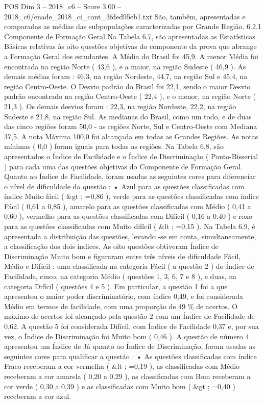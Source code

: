 \begin{textsample}{POS Dim 3 – 2018\_c6 – Score 3.00 – 2018\_c6/enade\_2018\_ci\_cont\_3fded95eb1.txt}
São, também, apresentadas e comparadas as médias das subpopulações caracterizadas por Grande Região. 6.2.1 Componente de Formação Geral Na Tabela 6.7, são apresentadas as Estatísticas Básicas relativas às oito questões objetivas do componente da prova que abrange a Formação Geral dos estudantes.
A Média do Brasil foi 45,9.
A menor Média foi encontrada na região Norte ( 43,6 ), e a maior, na região Sudeste ( 46,9 ).
As demais médias foram : 46,3, na região Nordeste, 44,7, na região Sul e 45,4, na região Centro-Oeste.
O Desvio padrão do Brasil foi 22,1, sendo o maior Desvio padrão encontrado na região Centro-Oeste ( 22,4 ), e o menor, na região Norte ( 21,3 ).
Os demais desvios foram : 22,3, na região Nordeste, 22,2, na região Sudeste e 21,8, na região Sul.
As medianas do Brasil, como um todo, e de duas das cinco regiões foram 50,0 - as regiões Norte, Sul e Centro-Oeste com Mediana 37,5.
A nota Máxima 100,0 foi alcançada em todas as Grandes Regiões.
As notas mínimas ( 0,0 ) foram iguais para todas as regiões.
Na Tabela 6.8, são apresentados o Índice de Facilidade e o Índice de Discriminação ( Ponto-Bisserial ) para cada uma das questões objetivas do Componente de Formação Geral.
Quanto ao Índice de Facilidade, foram usadas as seguintes cores para diferenciar o nível de dificuldade da questão : • Azul para as questões classificadas com índice Muito fácil ( \&gt ; =0,86 ), verde para as questões classificadas com índice Fácil ( 0,61 a 0,85 ), amarelo para as questões classificadas com Médio ( 0,41 a 0,60 ), vermelho para as questões classificadas com Difícil ( 0,16 a 0,40 ) e roxo para as questões classificadas com Muito difícil ( \&lt ; =0,15 ).
Na Tabela 6.9, é apresentada a distribuição das questões, levando -se em conta, simultaneamente, a classificação dos dois índices.
As oito questões obtiveram Índice de Discriminação Muito bom e figuraram entre três níveis de dificuldade Fácil, Médio e Difícil : uma classificada na categoria Fácil ( a questão 2 ) do Índice de Facilidade, cinco, na categoria Médio ( questões 1, 3, 6, 7 e 8 ), e duas, na categoria Difícil ( questões 4 e 5 ).
Em particular, a questão 1 foi a que apresentou o maior poder discriminatório, com índice 0,49, e foi considerada Médio em termos de facilidade, com uma proporção de 49 \% de acertos.
O máximo de acertos foi alcançado pela questão 2 com um Índice de Facilidade de 0,62.
A questão 5 foi considerada Difícil, com Índice de Facilidade 0,37 e, por sua vez, o Índice de Discriminação foi Muito bom ( 0,46 ).
A questão de número 4 apresentou um Índice de Já quanto ao Índice de Discriminação, foram usadas as seguintes cores para qualificar a questão : • As questões classificadas com índice Fraco receberam a cor vermelha ( \&lt ; =0,19 ), as classificadas com Médio receberam a cor amarela ( 0,20 a 0,29 ), as classificadas com Bom receberam a cor verde ( 0,30 a 0,39 ) e as classificadas com Muito bom ( \&gt ; =0,40 ) receberam a cor azul.

\end{textsample}
